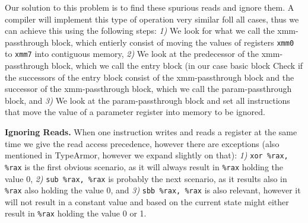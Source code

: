 %

Our solution to this problem is to find these spurious reads and ignore them. A compiler will implement this type of operation very 
similar foll all cases, thus we can achieve this using the following steps:
\textit{1)} We look for what we call the xmm-passthrough block, which entierly consist of moving the values of registers \texttt{xmm0} to 
\texttt{xmm7} into contiguous memory, %
\textit{2)} We look at the predecessor of the xmm-passthrough block, which we call the entry block (in our case basic block %
Check if the successors of the entry block consist of the xmm-passthrough block and the successor of the 
xmm-passthrough block, which we call the param-passthrough block, and
\textit{3)} We look at the param-passthrough block and set all instructions that move the value of a parameter register into memory to be
ignored. %

\textbf{Ignoring Reads.} When one instruction writes and reads a register at the same time we give the read access precedence, however there are exceptions (also mentioned in TypeArmor, however we expand slightly on that):
\textit{1)} \texttt{xor \%rax, \%rax} is the first obvious scenario, as it will always result in \texttt{\%rax} holding the value 0,
\textit{2)} \texttt{sub \%rax, \%rax} is probably the next scenario, as it results also in \texttt{\%rax} also holding the value 0, and
\textit{3)} \texttt{sbb \%rax, \%rax} is also relevant, however it will not result in a constant value and based on the current state might either result in \texttt{\%rax} holding the value 0 or 1.

